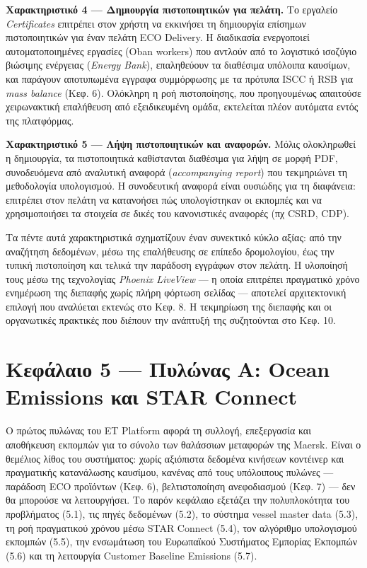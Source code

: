 \textbf{Χαρακτηριστικό 4 --- Δημιουργία πιστοποιητικών για πελάτη.} Το
εργαλείο \emph{Certificates} επιτρέπει στον χρήστη να εκκινήσει τη
δημιουργία επίσημων πιστοποιητικών για έναν πελάτη ECO Delivery. Η
διαδικασία ενεργοποιεί αυτοματοποιημένες εργασίες (Oban workers) που
αντλούν από το λογιστικό ισοζύγιο βιώσιμης ενέργειας (\emph{Energy
Bank}), επαληθεύουν τα διαθέσιμα υπόλοιπα καυσίμων, και παράγουν
αποτυπωμένα εγγραφα συμμόρφωσης με τα πρότυπα ISCC ή RSB για \emph{mass
balance} (Κεφ. 6). Ολόκληρη η ροή πιστοποίησης, που προηγουμένως
απαιτούσε χειρωνακτική επαλήθευση από εξειδικευμένη ομάδα, εκτελείται
πλέον αυτόματα εντός της πλατφόρμας.

\textbf{Χαρακτηριστικό 5 --- Λήψη πιστοποιητικών και αναφορών.} Μόλις
ολοκληρωθεί η δημιουργία, τα πιστοποιητικά καθίστανται διαθέσιμα για
λήψη σε μορφή PDF, συνοδευόμενα από αναλυτική αναφορά
(\emph{accompanying report}) που τεκμηριώνει τη μεθοδολογία υπολογισμού.
Η συνοδευτική αναφορά είναι ουσιώδης για τη διαφάνεια: επιτρέπει στον
πελάτη να κατανοήσει πώς υπολογίστηκαν οι εκπομπές και να χρησιμοποιήσει
τα στοιχεία σε δικές του κανονιστικές αναφορές (πχ CSRD, CDP).

Τα πέντε αυτά χαρακτηριστικά σχηματίζουν έναν συνεκτικό κύκλο αξίας: από
την αναζήτηση δεδομένων, μέσω της επαλήθευσης σε επίπεδο δρομολογίου,
έως την τυπική πιστοποίηση και τελικά την παράδοση εγγράφων στον πελάτη.
Η υλοποίησή τους μέσω της τεχνολογίας \emph{Phoenix LiveView} --- η
οποία επιτρέπει πραγματικό χρόνο ενημέρωση της διεπαφής χωρίς πλήρη
φόρτωση σελίδας --- αποτελεί αρχιτεκτονική επιλογή που αναλύεται εκτενώς
στο Κεφ. 8. Η τεκμηρίωση της διεπαφής και οι οργανωτικές πρακτικές που
διέπουν την ανάπτυξή της συζητούνται στο Κεφ. 10.

\pagebreak

\chapter{Κεφάλαιο 5 --- Πυλώνας Α: Ocean Emissions και STAR
Connect}\label{ux3baux3b5ux3c6ux3acux3bbux3b1ux3b9ux3bf-5-ux3c0ux3c5ux3bbux3ceux3bdux3b1ux3c2-ux3b1-ocean-emissions-ux3baux3b1ux3b9-star-connect}

Ο πρώτος πυλώνας του ET Platform αφορά τη συλλογή, επεξεργασία και
αποθήκευση εκπομπών για το σύνολο των θαλάσσιων μεταφορών της Maersk.
Είναι ο θεμέλιος λίθος του συστήματος: χωρίς αξιόπιστα δεδομένα κινήσεων
κοντέινερ και πραγματικής κατανάλωσης καυσίμου, κανένας από τους
υπόλοιπους πυλώνες --- παράδοση ECO προϊόντων (Κεφ. 6), βελτιστοποίηση
ανεφοδιασμού (Κεφ. 7) --- δεν θα μπορούσε να λειτουργήσει. Το παρόν
κεφάλαιο εξετάζει την πολυπλοκότητα του προβλήματος (5.1), τις πηγές
δεδομένων (5.2), το σύστημα vessel master data (5.3), τη ροή πραγματικού
χρόνου μέσω STAR Connect (5.4), τον αλγόριθμο υπολογισμού εκπομπών
(5.5), την ενσωμάτωση του Ευρωπαϊκού Συστήματος Εμπορίας Εκπομπών (5.6)
και τη λειτουργία Customer Baseline Emissions (5.7).

